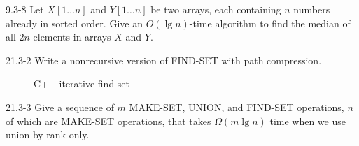 \begin{problem}{9.3-8}
  Let $X[1\ldots n]$ and $Y[1\ldots n]$ be two arrays, each containing $n$ numbers already in sorted order. Give an $O(\lg
  n)$-time algorithm to find the median of all $2n$ elements in arrays $X$ and $Y$.
\end{problem}

\begin{problem}{21.3-2}
  Write a nonrecursive version of FIND-SET with path compression.
  \begin{solution}
    \begin{figure}[H]
      \centering
      \caption{C++ iterative find-set}
      
    \end{figure}
  \end{solution}
\end{problem}

\begin{problem}{21.3-3}
  Give a sequence of $m$ MAKE-SET, UNION, and FIND-SET operations, $n$ of which are MAKE-SET operations, that takes
  $\Omega(m \lg n)$ time when we use union by rank only.
\end{problem}



